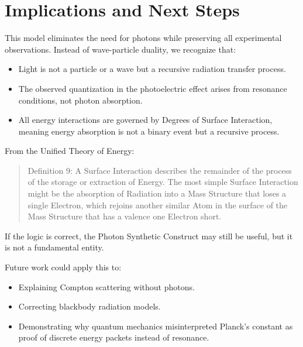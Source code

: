 \documentclass{article}
\begin{document}
\section{Implications and Next Steps}
This model eliminates the need for photons while preserving all experimental observations. Instead of wave-particle duality, we recognize that:
\begin{itemize}
    \item Light is not a particle or a wave but a recursive radiation transfer process.
    \item The observed quantization in the photoelectric effect arises from resonance conditions, not photon absorption.
    \item All energy interactions are governed by Degrees of Surface Interaction, meaning energy absorption is not a binary event but a recursive process.
\end{itemize}

From the Unified Theory of Energy:
\begin{quote}
Definition 9: A Surface Interaction describes the remainder of the process of the storage or extraction of Energy. The most simple Surface Interaction might be the absorption of Radiation into a Mass Structure that loses a single Electron, which rejoins another similar Atom in the surface of the Mass Structure that has a valence one Electron short.
\end{quote}

If the logic is correct, the Photon Synthetic Construct may still be useful, but it is not a fundamental entity.

Future work could apply this to:
\begin{itemize}
    \item Explaining Compton scattering without photons.
    \item Correcting blackbody radiation models.
    \item Demonstrating why quantum mechanics misinterpreted Planck’s constant as proof of discrete energy packets instead of resonance.
\end{itemize}
\end{document}
